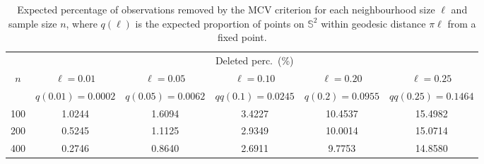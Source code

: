 \documentclass[12pt]{report} %
\begin{document}
\begin{table}[H]
\vspace{0.24cm}
    \centering
\fontsize{9pt}{11pt}\selectfont
\setlength{\tabcolsep}{5pt}
\renewcommand{\arraystretch}{1.15}
\begin{tabular}{c ccccc}
\toprule
 & \multicolumn{5}{c}{Deleted perc.\ (\%)} \\
\cmidrule(lr){2-6}
\(n\) & $\ell=0.01$ & $\ell=0.05$ & $\ell=0.10$ & $\ell=0.20$ & $\ell=0.25$ \\
      & $q(0.01)=0.0002$ & $q(0.05)=0.0062$ & $q q(0.1)=0.0245$ & $q(0.2)=0.0955$ & $q q(0.25)=0.1464$ \\
\midrule
100 & 1.0244 & 1.6094 & 3.4227 & 10.4537 & 15.4982 \\
200 & 0.5245 & 1.1125 & 2.9349 & 10.0014 & 15.0714 \\
400 & 0.2746 & 0.8640 & 2.6911 & 9.7753  & 14.8580 \\
\bottomrule
\end{tabular}
\caption{Expected percentage of observations removed by the MCV criterion for each neighbourhood size $\ell$ and sample size $n$, where $q(\ell)$ is the expected proportion of points on $\mathbb{S}^2$ within geodesic distance $\pi\ell$ from a fixed point.}
\label{tab:mcv-deleted-proportion}
\vspace{-0.1cm}
\end{table}
\end{document}
